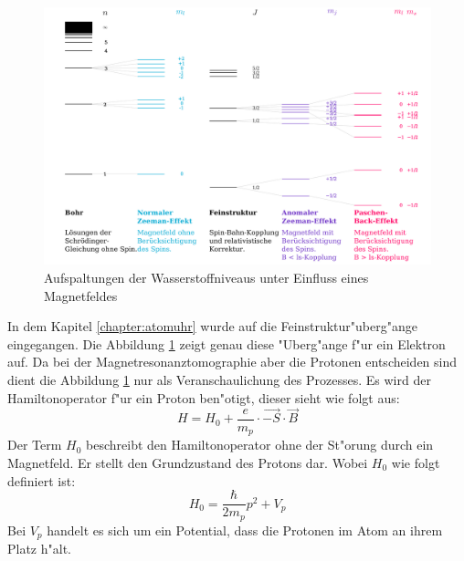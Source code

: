 \begin{figure}[h]
	\includegraphics[width = \textwidth]{./mri/pic/index}
	\caption{Aufspaltungen der Wasserstoffniveaus unter Einfluss eines Magnetfeldes \cite{Zeeman}}
	\label{mri:quant:abb:zeeman}
\end{figure}
In dem Kapitel \ref{chapter:atomuhr} wurde auf die Feinstruktur"uberg"ange eingegangen. Die Abbildung \ref{mri:quant:abb:zeeman} zeigt genau diese "Uberg"ange f"ur ein Elektron auf. Da bei der Magnetresonanztomographie aber die Protonen entscheiden sind dient die Abbildung \ref{mri:quant:abb:zeeman} nur als Veranschaulichung des Prozesses. Es wird der Hamiltonoperator f"ur ein Proton ben"otigt, dieser sieht wie folgt aus:
\begin{equation}
H = H_0 + \frac{e}{m_p }\cdot \vec{-S} \cdot \vec{B}
\label{mri:hamilton}
\end{equation}
Der Term $H_0$ beschreibt den Hamiltonoperator ohne der St"orung durch ein Magnetfeld. Er stellt den Grundzustand des Protons dar. Wobei $H_0$ wie folgt definiert ist:
\begin{equation}
H_0 = \frac{\hbar}{2m_p} p^2 + V_p
\end{equation}
Bei $V_p$ handelt es sich um ein Potential, dass die Protonen im Atom an ihrem Platz h"alt.


